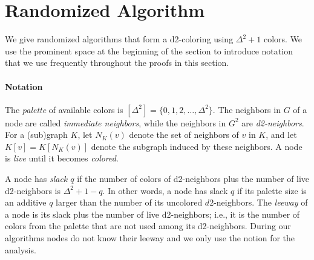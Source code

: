 
\section{Randomized Algorithm}
\label{sec:randAlg}
We give randomized {\congest} algorithms that form a d2-coloring using $\Delta^2+1$ colors. We use the prominent space at the beginning of the section to introduce notation that we use frequently throughout the proofs in this section.

\paragraph{Notation}
The \emph{palette} of available colors is $[\Delta^2] = \{0,1,2,\ldots, \Delta^2\}$. 
The neighbors in $G$ of a node are called \emph{immediate neighbors}, while the neighbors in $G^2$ are \emph{d2-neighbors}.
For a (sub)graph $K$, let $N_K(v)$ denote the set of neighbors of $v$ in $K$, and let $K[v] = K[N_K(v)]$ denote the subgraph induced by these neighbors.
A node is \emph{live} until it becomes \emph{colored}.

A node has \emph{slack $q$} if the number of colors of d2-neighbors plus the number of live d2-neighbors is $\Delta^2+1-q$. In other words, a node has slack $q$ if its palette size is an additive $q$ larger than the number of its uncolored $d2$-neighbors. 
The \emph{leeway} of a node is its slack plus the number of live d2-neighbors; i.e., it is the number of colors from the palette that are not used among its d2-neighbors.
During our algorithms nodes do not know their leeway and we only use the notion for the analysis.

